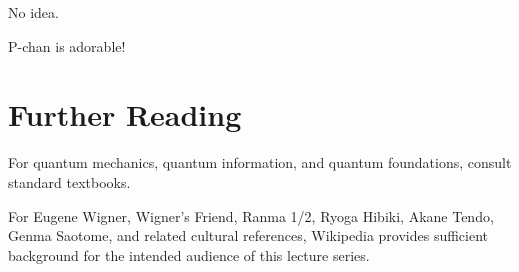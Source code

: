 \documentclass[12pt]{article}
\begin{document}
\begin{tcolorbox}[title=Ryoga:]
No idea.
\end{tcolorbox}

\begin{tcolorbox}[title={Akane (smiling):}]
P-chan is adorable!
\end{tcolorbox}


\section*{Further Reading}

For quantum mechanics, quantum information, and quantum foundations, consult standard textbooks.

For Eugene Wigner, Wigner's Friend, Ranma 1/2, Ryoga Hibiki, Akane Tendo, Genma Saotome, and related cultural references, Wikipedia provides sufficient background for the intended audience of this lecture series.
\end{document}
